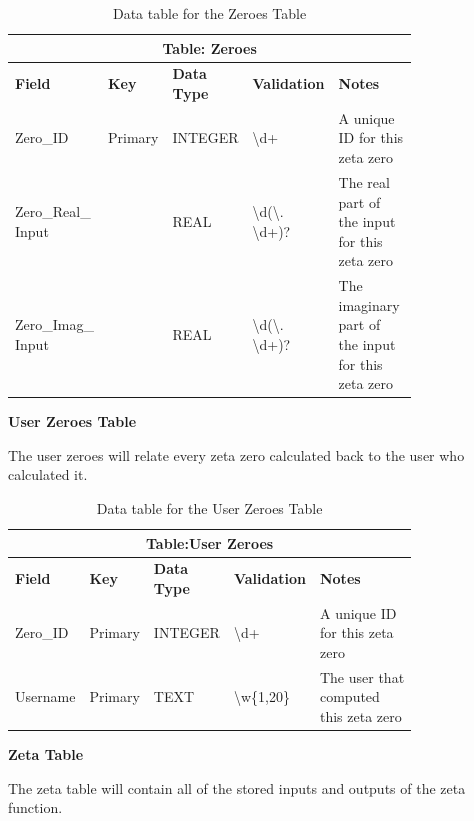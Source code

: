 \documentclass{article}
\begin{document}
\begin{table}[ht]
    \centering
    \begin{tabular}{ | p{0.15\linewidth} | p{0.1\linewidth} | p{0.16\linewidth} | p{0.14\linewidth} | p{0.25\linewidth} | }
    \hline
    \multicolumn{5}{|c|}{\textbf{Table: Zeroes}}\\
    \hline
    \hline
    \textbf{Field} & \textbf{Key} & \textbf{Data Type} & \textbf{Validation} & \textbf{Notes} \\
    \hline
    Zero\_ID & Primary & INTEGER & \textbackslash d+ & A unique ID for this zeta zero\\
    \hline
    Zero\_Real\_ Input & & REAL & \textbackslash d(\textbackslash. \textbackslash d+)? & The real part of the input for this zeta zero\\
    \hline
    Zero\_Imag\_ Input & & REAL & \textbackslash d(\textbackslash. \textbackslash d+)? & The imaginary part of the input for this zeta zero\\
    \hline
    \end{tabular}
    \caption{Data table for the Zeroes Table}
\end{table}

\clearpage
\textbf{User Zeroes Table}

The user zeroes will relate every zeta zero calculated back to the user who calculated it.

\begin{table}[ht]
    \centering
    \begin{tabular}{ | p{0.15\linewidth} | p{0.1\linewidth} | p{0.16\linewidth} | p{0.14\linewidth} | p{0.25\linewidth} | }
    \hline
    \multicolumn{5}{|c|}{\textbf{Table:User Zeroes}}\\
    \hline
    \hline
    \textbf{Field} & \textbf{Key} & \textbf{Data Type} & \textbf{Validation} & \textbf{Notes} \\
    \hline
    Zero\_ID & Primary & INTEGER & \textbackslash d+ & A unique ID for this zeta zero\\
    \hline
    Username & Primary & TEXT & \textbackslash w\{1,20\}& The user that computed this zeta zero\\
    \hline
    \end{tabular}
    \caption{Data table for the User Zeroes Table}
\end{table}


\textbf{Zeta Table}

The zeta table will contain all of the stored inputs and outputs of the zeta function.
\end{document}

